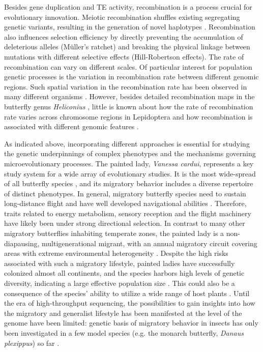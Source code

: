 \documentclass[twocolumn]{bmcart}%
\begin{document}
Besides gene duplication and TE activity, recombination is a process crucial for evolutionary innovation. Meiotic recombination shuffles existing segregating genetic variants, resulting in the generation of novel haplotypes \citep{penalbaMoleculesPopulationsAppreciating2020}. Recombination also influences selection efficiency by directly preventing the accumulation of deleterious alleles (Müller's ratchet) and breaking the physical linkage between mutations with different selective effects (Hill-Robertson effects). The rate of recombination can vary on different scales. Of particular interest for population genetic processes is the variation in recombination rate between different genomic regions. Such spatial variation in the recombination rate has been observed in many different organisms \citep{stapleyVariationRecombinationFrequency2017, tileyRelationshipRecombinationRate2015}. However, besides detailed recombination maps in the butterfly genus \textit{Heliconius} \citep{martinRecombinationRateVariation2019}, little is known about how the rate of recombination rate varies across chromosome regions in Lepidoptera and how recombination is associated with different genomic features \citep{haenelMetaanalysisChromosomescaleCrossover2018, tallaDissectingEffectsSelection2019}.

As indicated above, incorporating different approaches is essential for studying the genetic underpinnings of complex phenotypes and the mechanisms governing microevolutionary processes. The painted lady, \textit{Vanessa cardui}, represents a key study system for a wide array of evolutionary studies. It is the most wide-spread of all butterfly species \citep{talaveraRoundtripSaharaAfrotropical2018}, and its migratory behavior includes a diverse repertoire of distinct phenotypes. In general, migratory butterfly species need to sustain long-distance flight and have well developed navigational abilities \citep{chapmanLongrangeSeasonalMigration2015,guerra_magnetic_2014}. Therefore, traits related to energy metabolism, sensory reception and the flight machinery have likely been under strong directional selection. In contrast to many other migratory butterflies inhabiting temperate zones, the painted lady is a non-diapausing, multigenerational migrant, with an annual migratory circuit covering areas with extreme environmental heterogeneity \citep{talaveraDiscoveryMassMigration2016,menchetti_spatio-temporal_2019}. Despite the high risks associated with such a migratory lifestyle, painted ladies have successfully colonized almost all continents, and the species harbors high levels of genetic diversity, indicating a large effective population size \citep{garcia-berroGenomicDemographicInferenceinprep}. This could also be a consequence of the species’ ability to utilize a wide range of host plants \citep{celorio-manceraEvolutionaryHistoryHost2016, ackery_hostplants_1988}. Until the era of high-throughput sequencing, the possibilities to gain insights into how the migratory and generalist lifestyle has been manifested at the level of the genome have been limited: genetic basis of migratory behavior in insects has only been investigated in a few model species (e.g. the monarch butterfly, \textit{Danaus plexippus}) so far \citep{merlinGeneticsEpigeneticsAnimal2019}.
\end{document}

